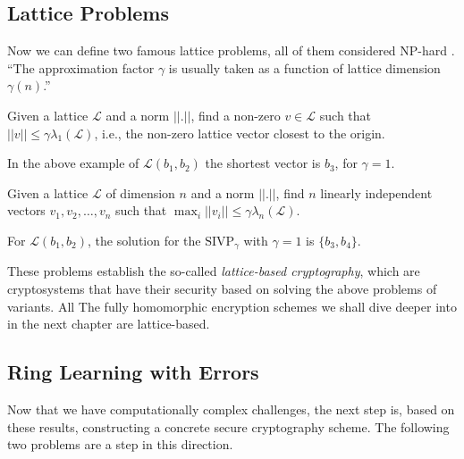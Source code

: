 \subsection{Lattice Problems}
Now we can define two famous lattice problems, all of them considered NP-hard \cite{hardnes}. ``The approximation factor $\gamma$ is usually taken as a function of lattice dimension $\gamma(n)$.'' \cite{ppt_dm}

\begin{definition} Given a lattice $\mathcal L$ and a norm $||.||$, find a non-zero $v\in\mathcal L$ such that $||v||\leq\gamma \lambda_1(\mathcal L)$, i.e., the non-zero lattice vector closest to the origin. 
\end{definition}

In the above example of $\mathcal L (b_1,b_2)$ the shortest vector is $b_3$, for $\gamma=1$.

\begin{definition} Given a lattice $\mathcal L$ of dimension $n$ and a norm $||.||$, find $n$ linearly independent vectors $v_1,v_2,\ldots,v_n$ such that $\displaystyle\max_{i}{||v_i||}\leq\gamma\lambda_n(\mathcal L)$.
\end{definition}

For $\mathcal L (b_1,b_2)$, the solution for the $\text{SIVP}_\gamma$ with $\gamma=1$ is $\{b_3,b_4\}$.

These problems establish the so-called \textit{lattice-based cryptography}, which are cryptosystems that have their security based on solving the above problems of variants. All The fully homomorphic encryption schemes we shall dive deeper into in the next chapter are lattice-based.

\subsection{Ring Learning with Errors}
Now that we have computationally complex challenges, the next step is, based on these results, constructing a concrete secure cryptography scheme. The following two problems are a step in this direction.

